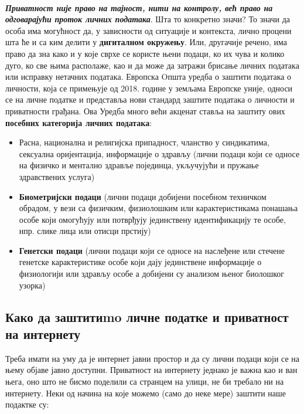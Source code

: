 \documentclass[a4paper]{article}
\begin{document}
\paragraph{} \textbf{\textit{Приватност није право на тајност, нити на контролу, већ право на одговарајући проток личних података}}\cite{1}. Шта то конкретно значи? То значи да особа има могућност да, у зависности од ситуације и контекста, лично процени шта ће и са ким делити у \textbf{дигиталном окружењу}. Или, другачије речено, има право да зна како и у које сврхе се користе њени подаци, ко их чува и колико дуго, ко све њима располаже, као и да може да затражи брисање личних података или исправку нетачних података.
Европска Oпшта уредба о заштити података о личности, која се  примењује од 2018. године у земљама Европске уније, односи се на личне податке и представља нови стандард заштите података о личности и приватности грађана. Ова Уредба много већи акценат ставља на заштиту ових \textbf{посебних категорија личних података}:
\begin{itemize}

\item     Расна, национална и религијска припадност, чланство у синдикатима, сексуална оријентација, информације о здрављу (лични подаци који се односе на физичко и ментално здравље појединца, укључујући и пружање здравствених услуга)
   
\item     \textbf{Биометријски подаци} (лични подаци добијени посебном техничком обрадом, у вези са физичким, физиолошким или карактеристикама понашања особе који омогућују или потврђују јединствену идентификацију те особе, нпр. слике лица или отисци прстију)
    
\item     \textbf{Генетски подаци} (лични подаци који се односе на наслеђене или стечене генетске карактеристике особе који дају јединствене информације о физиологији или здрављу особе а добијени су анализом њеног биолошког узорка)
    
\end{itemize}    
    
\subsection{Како да заштитиmo личне податке и приватност на интернету}

Треба имати на уму да је интернет јавни простор и да су лични подаци који се на њему објаве јавно доступни. Приватност на интернету једнако је важна као и ван њега, оно што не бисмо поделили са странцем на улици, не би требало ни на интернету. Неки од начина на које можемо (само до неке мере) заштити наше подактке  су:
	
\end{document}
